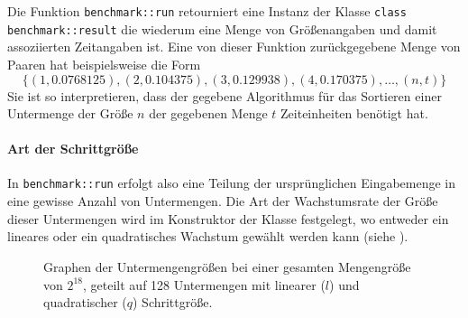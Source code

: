 Die Funktion \lstinline{benchmark::run} retourniert eine Instanz der Klasse \lstinline{class benchmark::result} die wiederum eine Menge von Größenangaben und damit assoziierten Zeitangaben ist. Eine von dieser Funktion zurückgegebene Menge von Paaren hat beispielsweise die Form
\begin{equation*}
	\{
		(1, 0.0768125),
		(2, 0.104375),
		(3, 0.129938),
		(4, 0.170375),
		\ldots,
		(n, t)
	\}
\end{equation*}
Sie ist so interpretieren, dass der gegebene Algorithmus für das Sortieren einer Untermenge der Größe $n$ der gegebenen Menge $t$ Zeiteinheiten benötigt hat.

\paragraph{Art der Schrittgröße}

In \lstinline{benchmark::run} erfolgt also eine Teilung der ursprünglichen Eingabemenge in eine gewisse Anzahl von Untermengen. Die Art der Wachstumsrate der Größe dieser Untermengen wird im Konstruktor der Klasse festgelegt, wo entweder ein lineares oder ein quadratisches Wachstum gewählt werden kann (siehe ).

\begin{figure}[h]
	\centering
	\begin{subfigure}[T]{0.485\textwidth}
	\end{subfigure}
	\hfill
	\begin{subfigure}[T]{0.485\textwidth}
	\end{subfigure}
	\caption{Graphen der Untermengengrößen bei einer gesamten Mengengröße von $2^{18}$, geteilt auf 128 Untermengen mit linearer ($l$) und quadratischer ($q$) Schrittgröße.}
	\label{fig:step-type-graphs}
\end{figure}

